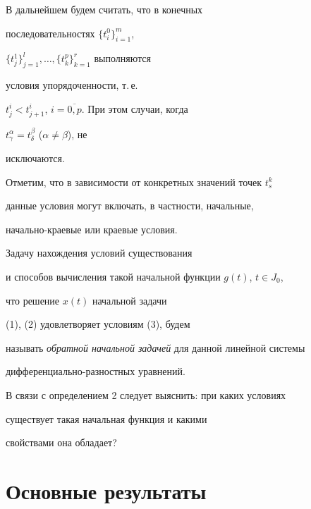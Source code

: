 \begin{note}


В дальнейшем будем считать, что в конечных


последовательностях $\{t_i^0\}_{i=1}^{m}$,




$\{t_j^1\}_{j=1}^{l},\dotsc, \{t_k^p\}_{k=1}^{r}$ выполняются


условия упорядоченности, т.\,е.


$t_j^i<t_{j+1}^i$, $i=\overline{0,p}$. При этом случаи, когда


$t_{\gamma}^{\alpha}=t_{\delta}^{\beta}$ ($\alpha \neq \beta$), не


исключаются.


\end{note}





Отметим, что в зависимости от конкретных значений точек $t_s^k$ 


данные условия могут включать, в частности, начальные, 


начально-краевые или краевые условия.





\begin{defn}


Задачу нахождения условий существования


и способов вычисления такой начальной функции $g(t)$, $t\in J_0$,


что решение $x(t)$ начальной задачи


(1), (2) удовлетворяет условиям (3), будем


называть {\em обратной начальной задачей} для данной линейной системы


дифференциально-разностных уравнений.


\end{defn}





В связи с определением 2 следует выяснить: при каких условиях


существует такая начальная функция и какими


свойствами она обладает?








\section{Основные результаты}





